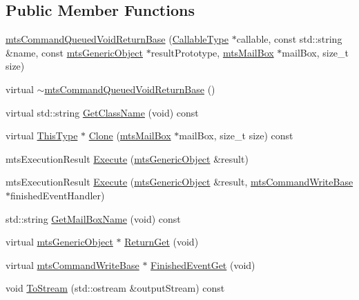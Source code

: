 \subsection*{Public Member Functions}
\begin{DoxyCompactItemize}
\item 
\hyperlink{classmts_command_queued_void_return_base_a9bbf129db24fd5d75684bc14d81535e6}{mts\+Command\+Queued\+Void\+Return\+Base} (\hyperlink{classmts_command_queued_void_return_base_a66e6a106a0c17625d9f0ec9a33ff634a}{Callable\+Type} $\ast$callable, const std\+::string \&name, const \hyperlink{classmts_generic_object}{mts\+Generic\+Object} $\ast$result\+Prototype, \hyperlink{classmts_mail_box}{mts\+Mail\+Box} $\ast$mail\+Box, size\+\_\+t size)
\item 
virtual \hyperlink{classmts_command_queued_void_return_base_ad2a3070b78c5bac00e8d6d7c798944f3}{$\sim$mts\+Command\+Queued\+Void\+Return\+Base} ()
\item 
virtual std\+::string \hyperlink{classmts_command_queued_void_return_base_acfdaaf157d65cf3b30a97fcfa6c01950}{Get\+Class\+Name} (void) const 
\item 
virtual \hyperlink{classmts_command_queued_void_return_base_a336bb46e1c968dc3003f9dc163c9f82c}{This\+Type} $\ast$ \hyperlink{classmts_command_queued_void_return_base_a21cc45ebaff3f83c0c39d264467dff4f}{Clone} (\hyperlink{classmts_mail_box}{mts\+Mail\+Box} $\ast$mail\+Box, size\+\_\+t size) const 
\item 
mts\+Execution\+Result \hyperlink{classmts_command_queued_void_return_base_a3a98e0b06cb0e7793d1ebccaad83bec9}{Execute} (\hyperlink{classmts_generic_object}{mts\+Generic\+Object} \&result)
\item 
mts\+Execution\+Result \hyperlink{classmts_command_queued_void_return_base_aceea05da6017b3b8fd3d6b1b7d34dd8e}{Execute} (\hyperlink{classmts_generic_object}{mts\+Generic\+Object} \&result, \hyperlink{classmts_command_write_base}{mts\+Command\+Write\+Base} $\ast$finished\+Event\+Handler)
\item 
std\+::string \hyperlink{classmts_command_queued_void_return_base_a599785ddb2248dc937215a3c6579df68}{Get\+Mail\+Box\+Name} (void) const 
\item 
virtual \hyperlink{classmts_generic_object}{mts\+Generic\+Object} $\ast$ \hyperlink{classmts_command_queued_void_return_base_ae92644324ed045effc08e0b6b2318660}{Return\+Get} (void)
\item 
virtual \hyperlink{classmts_command_write_base}{mts\+Command\+Write\+Base} $\ast$ \hyperlink{classmts_command_queued_void_return_base_abf2ce97d829469ae426a23f164a8364e}{Finished\+Event\+Get} (void)
\item 
void \hyperlink{classmts_command_queued_void_return_base_a7b6e745feb4966a04279f2a2ab12d481}{To\+Stream} (std\+::ostream \&output\+Stream) const 
\end{DoxyCompactItemize}
